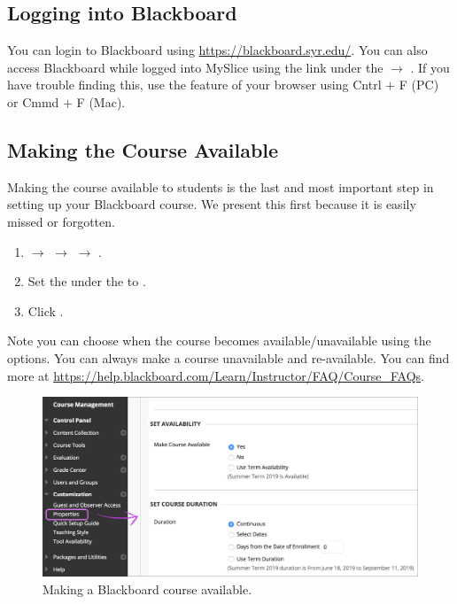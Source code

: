 \subsection{Logging into Blackboard}

You can login to Blackboard using \url{https://blackboard.syr.edu/}. You can also access Blackboard while logged into MySlice using the  link under the  $\to$ . If you have trouble finding this, use the  feature of your browser using Cntrl $+$ F (PC) or Cmmd $+$ F (Mac). 



\subsection{Making the Course Available}

Making the course available to students is the last and most important step in setting up your Blackboard course. We present this first because it is easily missed or forgotten. 

\begin{enumerate}[1.]
\item {} $\to$  $\to$  $\to$ .
\item Set the  under the  to .
\item Click .
\end{enumerate}

Note you can choose when the course becomes available/unavailable using the  options. You can always make a course unavailable and re-available. You can find more at \url{https://help.blackboard.com/Learn/Instructor/FAQ/Course_FAQs}.

	\begin{figure}[!ht]
	\centering
	\includegraphics[width=1.1\textwidth]{sections/blackboard/images/original_course_availability.png}
	\caption{Making a Blackboard course available.}
	\end{figure}



